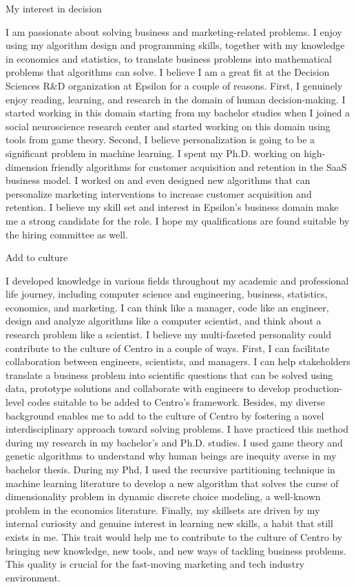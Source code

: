 My interest in decision

I am passionate about solving business and marketing-related problems. I enjoy using my algorithm design and programming skills, together with my knowledge in economics and statistics, to translate business problems into mathematical problems that algorithms can solve.
I believe I am a great fit at the Decision Sciences R&D organization at Epsilon for a couple of reasons. First, I genuinely enjoy reading, learning, and research in the domain of human decision-making. I started working in this domain starting from my bachelor studies when I joined a social neuroscience research center and started working on this domain using tools from game theory. 
Second, I believe personalization is going to be a significant problem in machine learning. I spent my Ph.D. working on high-dimension friendly algorithms for customer acquisition and retention in the SaaS business model. I worked on and even designed new algorithms that can personalize marketing interventions to increase customer acquisition and retention.
I believe my skill set and interest in Epsilon's business domain make me a strong candidate for the role. I hope my qualifications are found suitable by the hiring committee as well.


Add to culture

I developed knowledge in various fields throughout my academic and professional life journey, including computer science and engineering, business, statistics, economics, and marketing. I can think like a manager, code like an engineer, design and analyze algorithms like a computer scientist, and think about a research problem like a scientist. I believe my multi-faceted personality could contribute to the culture of Centro in a couple of ways.
First, I can facilitate collaboration between engineers, scientists, and managers. I can help stakeholders translate a business problem into scientific questions that can be solved using data, prototype solutions and collaborate with engineers to develop production-level codes suitable to be added to Centro's framework.
Besides, my diverse background enables me to add to the culture of Centro by fostering a novel interdisciplinary approach toward solving problems. I have practiced this method during my research in my bachelor's and Ph.D. studies. I used game theory and genetic algorithms to understand why human beings are inequity averse in my bachelor thesis. During my Phd, I used the recursive partitioning technique in machine learning literature to develop a new algorithm that solves the curse of dimensionality problem in dynamic discrete choice modeling, a well-known problem in the economics literature.
Finally, my skillsets are driven by my internal curiosity and genuine interest in learning new skills, a habit that still exists in me. This trait would help me to contribute to the culture of Centro by bringing new knowledge, new tools, and new ways of tackling business problems. This quality is crucial for the fast-moving marketing and tech industry environment.